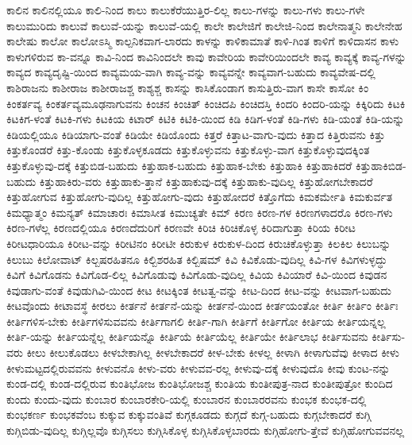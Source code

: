 {ಕಾಲಿನ
ಕಾಲಿನಲ್ಲಿಯೂ
ಕಾಲಿ-ನಿಂದ
ಕಾಲು
ಕಾಲುಕೆರೆಯುತ್ತಿರ-ಲಿಲ್ಲ
ಕಾಲು-ಗಳನ್ನು
ಕಾಲು-ಗಳು
ಕಾಲು-ಗಳೇ
ಕಾಲುಮುರಿದು
ಕಾಲುವೆ
ಕಾಲುವೆ-ಯನ್ನು
ಕಾಲುವೆ-ಯಲ್ಲಿ
ಕಾಲೇ
ಕಾಲೇಜಿಗೆ
ಕಾಲೇಜಿ-ನಿಂದ
ಕಾಲೇನಾತ್ಮನಿ
ಕಾಲೇನೇಹ
ಕಾಲೇಷು
ಕಾಲೋ
ಕಾಲೋಽಸ್ಮಿ
ಕಾಲ್ಪನಿಕವಾಗ-ಲಾರದು
ಕಾಳನ್ನು
ಕಾಳಿಕಾಮಾತೆ
ಕಾಳಿ-ಗಿಂತ
ಕಾಳಿಗೆ
ಕಾಳಿದಾಸನ
ಕಾಳು
ಕಾಳುಗಳಿರುವ
ಕಾ-ವನ್ನೂ
ಕಾವಿ-ನಿಂದ
ಕಾವಿನಿಂದಲೇ
ಕಾವು
ಕಾವೇರಿಯ
ಕಾವೇರಿಯಿಂದಲೇ
ಕಾವ್ಯ
ಕಾವ್ಯಕ್ಕೆ
ಕಾವ್ಯ-ಗಳನ್ನು
ಕಾವ್ಯದ
ಕಾವ್ಯದೃಷ್ಟಿ-ಯಿಂದ
ಕಾವ್ಯಮಯ-ವಾಗಿ
ಕಾವ್ಯ-ವನ್ನು
ಕಾವ್ಯವನ್ನೇ
ಕಾವ್ಯವಾಗ-ಬಹುದು
ಕಾವ್ಯವೇಷ-ದಲ್ಲಿ
ಕಾಶಿರಾಜನು
ಕಾಶೀರಾಜ
ಕಾಶೀರಾಜಶ್ಚ
ಕಾಶ್ಯಶ್ಚ
ಕಾಸನ್ನು
ಕಾಸಿಕೊಂಡಾಗ
ಕಾಸುತ್ತಿರು-ವಾಗ
ಕಾಸೇ
ಕಾಸೋ
ಕಿಂ
ಕಿಂಕರ್ತವ್ಯ
ಕಿಂಕರ್ತವ್ಯಮೂಢನಾಗುವನು
ಕಿಂಚನ
ಕಿಂಚಿತ್
ಕಿಂಚಿದಪಿ
ಕಿಂಚಿದಸ್ತಿ
ಕಿಂದರಿ
ಕಿಂದರಿ-ಯನ್ನು
ಕಿಕ್ಕಿರಿದು
ಕಿಟಕಿ
ಕಿಟಕಿಗ-ಳಂತೆ
ಕಿಟಕಿ-ಗಳು
ಕಿಟಕಿಯ
ಕಿಟಾರ್
ಕಿಟಿಕಿ
ಕಿಟಿಕಿ-ಯಿಂದ
ಕಿಡಿ
ಕಿಡಿಗ-ಳಂತೆ
ಕಿಡಿ-ಗಳು
ಕಿಡಿ-ಯಂತೆ
ಕಿಡಿ-ಯನ್ನು
ಕಿಡಿಯಲ್ಲಿಯೂ
ಕಿಡಿಯಾಗು-ವಂತೆ
ಕಿಡಿಯೇ
ಕಿಡಿಯೊಂದು
ಕಿತ್ತರೆ
ಕಿತ್ತಾಟ-ವಾಗು-ವುದು
ಕಿತ್ತಾದ
ಕಿತ್ತಿರುವನು
ಕಿತ್ತು
ಕಿತ್ತುಕೊಂಡರೆ
ಕಿತ್ತು-ಕೊಂಡು
ಕಿತ್ತುಕೊಳ್ಳಕೂಡದು
ಕಿತ್ತುಕೊಳ್ಳುವನು
ಕಿತ್ತುಕೊಳ್ಳು-ವಾಗ
ಕಿತ್ತುಕೊಳ್ಳುವುದಕ್ಕಿಂತ
ಕಿತ್ತುಕೊಳ್ಳುವು-ದಕ್ಕೆ
ಕಿತ್ತುಬಿಡ-ಬಹುದು
ಕಿತ್ತುಹಾಕ-ಬಹುದು
ಕಿತ್ತುಹಾಕ-ಬೇಕು
ಕಿತ್ತುಹಾಕಿ
ಕಿತ್ತುಹಾಕಿದರೆ
ಕಿತ್ತುಹಾಕಿಬಿಡ-ಬಹುದು
ಕಿತ್ತುಹಾಕಿರು-ವರು
ಕಿತ್ತುಹಾಕು-ತ್ತಾನೆ
ಕಿತ್ತುಹಾಕುವು-ದಕ್ಕೆ
ಕಿತ್ತುಹಾಕು-ವುದಿಲ್ಲ
ಕಿತ್ತುಹೋಗಬೇಕಾದರೆ
ಕಿತ್ತುಹೋಗುವ
ಕಿತ್ತುಹೋಗು-ವುದಿಲ್ಲ
ಕಿತ್ತುಹೋಗು-ವುದು
ಕಿತ್ತುಹೋದರೆ
ಕಿತ್ತೊಗೆದು
ಕಿಮಕರ್ಮೇತಿ
ಕಿಮಕುರ್ವತ
ಕಿಮಧ್ಯಾತ್ಮಂ
ಕಿಮನ್ಯತ್
ಕಿಮಾಚಾರಃ
ಕಿಮಾಸೀತ
ಕಿಮುಚ್ಯತೇ
ಕಿಮ್
ಕಿರಣ
ಕಿರಣ-ಗಳ
ಕಿರಣಗಳಾದರೊ
ಕಿರಣ-ಗಳು
ಕಿರಣ-ಗಳೆಲ್ಲ
ಕಿರಣದಲ್ಲಿಯೂ
ಕಿರಣದೆದುರಿಗೆ
ಕಿರಣವೇ
ಕಿರಿಚಿ
ಕಿರಿಚಿಕೊಳ್ಳ
ಕಿರಿದಾಗುತ್ತಾ
ಕಿರಿಯ
ಕಿರೀಟ
ಕಿರೀಟಧಾರಿಯೂ
ಕಿರೀಟ-ವನ್ನು
ಕಿರೀಟಿನಂ
ಕಿರೀಟೀ
ಕಿರುಕುಳ
ಕಿರುಕುಳ-ದಿಂದ
ಕಿರುಚಿಕೊಳ್ಳುತ್ತಾ
ಕಿಲಕಿಲ
ಕಿಲುಬನ್ನು
ಕಿಲುಬು
ಕಿಲೋವಾಟ್
ಕಿಲ್ಬಷರಹಿತನೂ
ಕಿಲ್ಬಿಶರಹಿತ
ಕಿಲ್ಬಿಷಮ್
ಕಿವಿ
ಕಿವಿಕೊಡು-ವುದಿಲ್ಲ
ಕಿವಿ-ಗಳ
ಕಿವಿಗಳುಳ್ಳದ್ಧು
ಕಿವಿಗೆ
ಕಿವಿಗೊಡನು
ಕಿವಿಗೊಡ-ಲಿಲ್ಲ
ಕಿವಿಗೊಡುವು
ಕಿವಿಗೊಡು-ವುದಿಲ್ಲ
ಕಿವಿಯ
ಕಿವಿಯಾರೆ
ಕಿವಿ-ಯಿಂದ
ಕಿವುಡನ
ಕಿವುಡಾಗು-ವಂತೆ
ಕಿವುಡುಗಿವಿ-ಯಿಂದ
ಕೀಟ
ಕೀಟಕ್ಕಿಂತ
ಕೀಟತ್ವ-ವನ್ನು
ಕೀಟ-ದಿಂದ
ಕೀಟ-ವನ್ನು
ಕೀಟವಾಗ-ಬಹುದು
ಕೀಟವೊಂದು
ಕೀಟಾವಸ್ಥೆ
ಕೀರಲು
ಕೀರ್ತನೆ
ಕೀರ್ತನೆ-ಯನ್ನು
ಕೀರ್ತನೆ-ಯಿಂದ
ಕೀರ್ತಯಂತೋ
ಕೀರ್ತಿ
ಕೀರ್ತಿಂ
ಕೀರ್ತಿಃ
ಕೀರ್ತಿಗಳಿಸ-ಬೇಕು
ಕೀರ್ತಿಗಳಿಸುವವನು
ಕೀರ್ತಿಗಾಗಲಿ
ಕೀರ್ತಿ-ಗಾಗಿ
ಕೀರ್ತಿಗೆ
ಕೀರ್ತಿಗೋ
ಕೀರ್ತಿಯ
ಕೀರ್ತಿಯನ್ನಲ್ಲ
ಕೀರ್ತಿ-ಯನ್ನು
ಕೀರ್ತಿಯನ್ನೆಲ್ಲ
ಕೀರ್ತಿಯನ್ನೊ
ಕೀರ್ತಿಯೆ
ಕೀರ್ತಿಯೆಲ್ಲ
ಕೀರ್ತಿಯೇ
ಕೀರ್ತಿಲಾಭ
ಕೀರ್ತಿಸುವನು
ಕೀರ್ತಿಸು-ವರು
ಕೀಲು
ಕೀಲುಕೊಡಲು
ಕೀಳಬೇಕಾಗಿಲ್ಲ
ಕೀಳಬೇಕಾದರೆ
ಕೀಳ-ಬೇಕು
ಕೀಳಲ್ಲ
ಕೀಳಾಗಿ
ಕೀಳಾಗುವೆವು
ಕೀಳಾದ
ಕೀಳು
ಕೀಳುಮಟ್ಟದಲ್ಲಿರುವವನು
ಕೀಳುವನೊ
ಕೀಳು-ವರು
ಕೀಳುವವ-ರಲ್ಲ
ಕೀಳುವು-ದಕ್ಕೆ
ಕೀಳುವುದೊ
ಕೀವು
ಕುಂಟ-ನನ್ನು
ಕುಂಡ-ದಲ್ಲಿ
ಕುಂಡ-ದಲ್ಲಿರುವ
ಕುಂತಿಭೋಜ
ಕುಂತಿಭೋಜಶ್ಚ
ಕುಂತಿಯ
ಕುಂತೀಪುತ್ರ-ನಾದ
ಕುಂತೀಪುತ್ರೋ
ಕುಂದಿದ
ಕುಂದು
ಕುಂದು-ವುದು
ಕುಂಬಾರ
ಕುಂಬಾರಕೇರಿ-ಯಲ್ಲಿ
ಕುಂಬಾರನ
ಕುಂಬಾರರವನು
ಕುಂಭಕ
ಕುಂಭಕ-ದಲ್ಲಿ
ಕುಂಭಕರ್ಣ
ಕುಂಭಕವೆಂಬ
ಕುಕ್ಕುವ
ಕುಕ್ಕುವಂತಿವೆ
ಕುಗ್ಗಕೂಡದು
ಕುಗ್ಗದೆ
ಕುಗ್ಗ-ಬಹುದು
ಕುಗ್ಗಬೇಕಾದರೆ
ಕುಗ್ಗಿ
ಕುಗ್ಗಿಬಿಡು-ವುದಿಲ್ಲ
ಕುಗ್ಗಿಲ್ಲವೊ
ಕುಗ್ಗಿಸಲು
ಕುಗ್ಗಿಸಿಕೊಳ್ಳ
ಕುಗ್ಗಿಸಿಕೊಳ್ಳಬಾರದು
ಕುಗ್ಗಿಹೋಗು-ತ್ತೇವೆ
ಕುಗ್ಗಿಹೋಗುವವನಲ್ಲ
}
